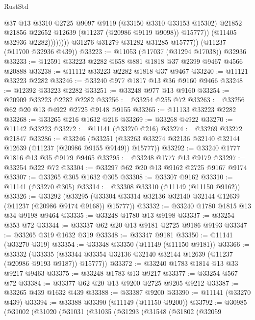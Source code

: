 \begin{lexlean}{RustStd}
\begin{coremodule}
                          @37
                          @13
                          @3310
                          @2725
                          @9097
                          @9119
                          (@33150 @3310 @33153 @15302)
                          @21852
                          @21856
                          @22652
                          @12639
                          (@11237 (@20986 @9119 @9098))
                          @15777))
                      (@11405 @32936 @2282))))))))
        @31276
        @31279
        @31282
        @31285
        @15777))
    (@11237 (@11700 @32936 @439))
@33223 := @11053 (@17037 (@31294 @17038)) @32936
@33233 := @12591 @33223 @2282 @658 @881 @1818 @37 @2399 @9467 @4566 @20888
@33238 := @11112 @33223 @2282 @1818 @37 @9467
@33240 := @11121 @33223 @2282
@33246 := @33240 @977 @1817 @13 @36 @9160 @9466
@33248 := @12392 @33223 @2282
@33251 := @33248 @977 @13 @9160
@33254 := @20909 @33223 @2282 @2282
@33256 := @33254 @255 @72
@33263 := @33256 @62 @20 @13 @4922 @2725 @9148 @9155
@33265 := @11133 @33223 @2282
@33268 := @33265 @216 @1632 @216
@33269 := @33268 @4922
@33270 := @11142 @33223
@33272 := @11141 (@33270 @216)
@33274 := @33269 @33272 @21847
@33286 := @33246
    (@33251 (@33263 @33274 @32136 @32140 @32144 @12639 (@11237 (@20986 @9155 @9149)) @15777))
@33292 := @33240 @1777 @1816 @13 @35 @9179 @9465
@33295 := @33248 @1777 @13 @9179
@33297 := @33254 @322 @72
@33304 := @33297 @62 @20 @13 @9162 @2725 @9167 @9174
@33307 := @33265 @305 @1632 @305
@33308 := @33307 @9162
@33310 := @11141 (@33270 @305)
@33314 := @33308 @33310 (@11149 (@11150 @9162))
@33326 := @33292
    (@33295 (@33304 @33314 @32136 @32140 @32144 @12639 (@11237 (@20986 @9174 @9168)) @15777))
@33332 := @33240 @1780 @1815 @13 @34 @9198 @9464
@33335 := @33248 @1780 @13 @9198
@33337 := @33254 @353 @72
@33344 := @33337 @62 @20 @13 @9181 @2725 @9186 @9193
@33347 := @33265 @319 @1632 @319
@33348 := @33347 @9181
@33350 := @11141 (@33270 @319)
@33354 := @33348 @33350 (@11149 (@11150 @9181))
@33366 := @33332
    (@33335 (@33344 @33354 @32136 @32140 @32144 @12639 (@11237 (@20986 @9193 @9187)) @15777))
@33372 := @33240 @1783 @1814 @13 @33 @9217 @9463
@33375 := @33248 @1783 @13 @9217
@33377 := @33254 @567 @72
@33384 := @33377 @62 @20 @13 @9200 @2725 @9205 @9212
@33387 := @33265 @439 @1632 @439
@33388 := @33387 @9200
@33390 := @11141 (@33270 @439)
@33394 := @33388 @33390 (@11149 (@11150 @9200))
@33792 := @30985
    (@31002
      (@31020
        (@31031
          (@31035
            (@31293
              (@31548
                (@31802
                  (@32059

\end{coremodule}
\end{lexlean}
